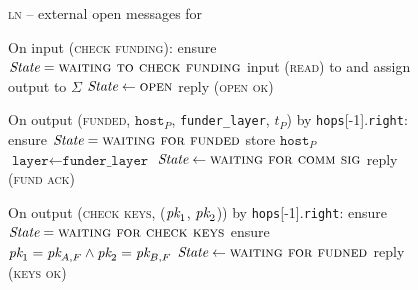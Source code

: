 \begin{figure}[H]
  \begin{processbox}{\textsc{ln} -- external open messages for \bob}
    \begin{algorithmic}[1]
      \State On input (\textsc{check funding}):
      \Indent
        \State ensure $\itistate = \textsc{waiting to check funding}$
        \State input (\textsc{read}) to \ledger and assign output to $\Sigma$
          \State $\itistate \gets \textsc{open}$
          \label{code:ln:bob:state-open}
          \State reply (\textsc{open ok})
        \EndIf
      \EndIndent
      \Statex

      \State On output (\textsc{funded}, $\texttt{host}_P$,
      \texttt{funder\_layer}, $t_P$) by \texttt{hops}[-1].\texttt{right}:
      \label{code:ln:bob:funded}
      \Indent
        \State ensure $\itistate = \textsc{waiting for funded}$
        \State store $\texttt{host}_P$ 
        \label{code:ln:bob:host}
        \State $\texttt{layer} \gets \texttt{funder\_layer}$
        \State $\itistate \gets \textsc{waiting for comm sig}$
        \State reply (\textsc{fund ack})
      \EndIndent
      \Statex

      \State On output (\textsc{check keys}, ($\textit{pk}_{1}$, $\textit{pk}_{2}$)) by
      \texttt{hops}[-1].\texttt{right}:
      \Indent
        \State ensure $\itistate = \textsc{waiting for check keys}$
        \State ensure $\textit{pk}_{1} = \textit{pk}_{A, F} \wedge \textit{pk}_{2} = \textit{pk}_{B, F}$
        \State $\itistate \gets \textsc{waiting for fudned}$
        \State reply (\textsc{keys ok})
      \EndIndent
    \end{algorithmic}
  \end{processbox}
  \caption{}
  \label{code:ln:bob}
\end{figure}

